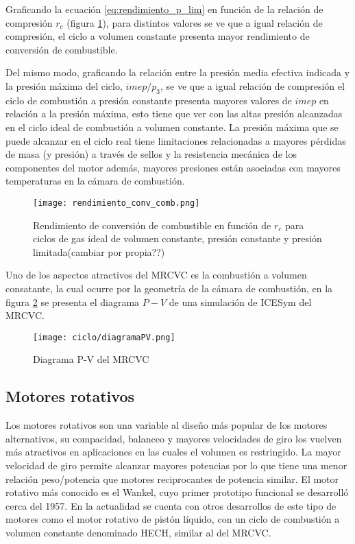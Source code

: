Graficando la ecuación \ref{eq:rendimiento_p_lim} en función de la relación de
compresión $r_c$ (figura \ref{fig:rendimientos}), para distintos valores se ve
que a igual relación de compresión, el ciclo a volumen constante presenta mayor
rendimiento de conversión de combustible.

Del mismo modo, graficando la relación entre la presión media efectiva indicada
y la presión máxima del ciclo, $imep/p_3$, se ve que a igual relación de
compresión el ciclo de combustión a presión constante presenta mayores valores
de $imep$ en relación a la presión máxima, esto tiene que ver con las altas
presión alcanzadas en el ciclo ideal de combustión a volumen constante.
%
La presión máxima que se puede alcanzar en el ciclo real tiene limitaciones
relacionadas a mayores pérdidas de masa (y presión) a través de sellos y la
resistencia mecánica de los componentes del motor además, mayores presiones
están asociadas con mayores temperaturas en la cámara de combustión.

\begin{figure} \centering
    \texttt{[image: rendimiento\_conv\_comb.png]}
    \caption{Rendimiento de conversión de combustible en función de $r_c$ para
    ciclos de gas ideal de volumen constante, presión constante y presión
    limitada(cambiar por propia??)} \label{fig:rendimientos}
\end{figure}

Uno de los aspectos atractivos del MRCVC es la combustión a volumen consatante,
la cual ocurre por la geometría de la cámara de combustión, en la figura
\ref{fig:ciclo_mrcvc} se presenta el diagrama $P-V$ de una simulación de ICESym
del MRCVC.
%
\begin{figure} \centering
    \texttt{[image: ciclo/diagramaPV.png]}
    \caption{Diagrama P-V del MRCVC}\label{fig:ciclo_mrcvc}
\end{figure}


\subsection{Motores rotativos}
%
Los motores rotativos son una variable al diseño más popular de los motores
alternativos, su compacidad, balanceo y mayores velocidades de giro los vuelven
más atractivos en aplicaciones en las cuales el volumen es restringido.
%
La mayor velocidad de giro permite alcanzar mayores potencias por lo que tiene
una menor relación peso/potencia que motores reciprocantes de potencia similar.
%
El motor rotativo más conocido es el Wankel, cuyo primer prototipo funcional se
desarrolló cerca del 1957. 
%
En la actualidad se cuenta con otros desarrollos de este tipo de motores como
el motor rotativo de pistón líquido, con un ciclo de combustión a volumen
constante denominado HECH\parencite{hehc_05}, similar al del MRCVC.

